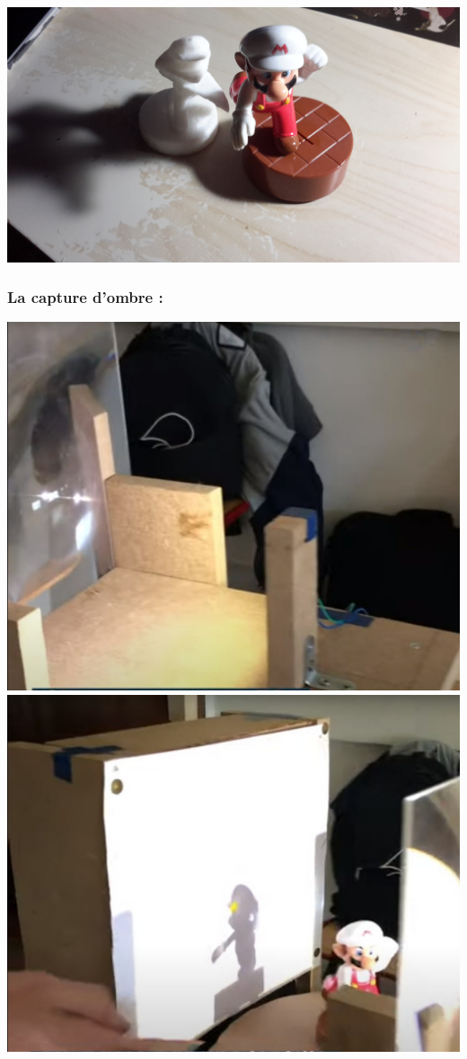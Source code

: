 \documentclass{article}
\begin{document}
\includegraphics[scale=0.1]{12}

\subsubsection*{La capture d'ombre :}

\includegraphics[scale=0.25]{1}\includegraphics[scale=0.25]{2}
\end{document}
